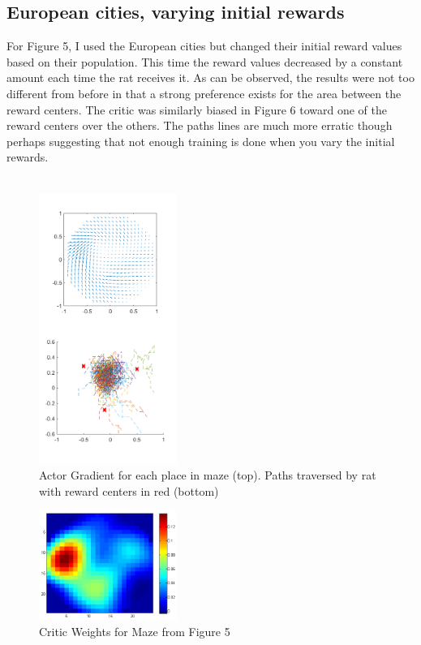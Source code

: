 \documentclass[conference]{IEEEtran}
\begin{document}
\subsection{European cities, varying initial rewards}

For Figure 5, I used the European cities but changed their initial reward values based on their population. This time the reward values decreased by a constant amount each time the rat receives it. As can be observed, the results were not too different from before in that a strong preference exists for the area between the reward centers. The critic was similarly biased in Figure 6 toward one of the reward centers over the others. The paths lines are much more erratic though perhaps suggesting that not enough training is done when you vary the initial rewards. \\
\\
\begin{figure}
\includegraphics[width=0.4\textwidth]{waterMazeRevised2_Figure_populationRewards.png} 
\caption{Actor Gradient for each place in maze (top). Paths traversed by rat with reward centers in red (bottom)}
\end{figure}

\begin{figure}
\includegraphics[width=0.4\textwidth]{waterMazeRevised2_Critic_populationRewards.png} 
\caption{Critic Weights for Maze from Figure 5}
\end{figure}
\end{document}
